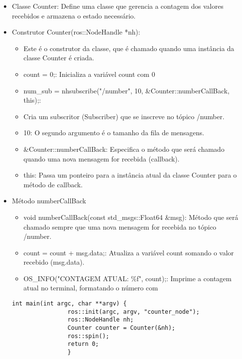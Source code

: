 \documentclass[letterpaper]{article}
\begin{document}
\begin{itemize}
\begin{lstlisting}[style=cppStyle, title= declaração da classe counter ]
            \end{lstlisting}
            \item Classe Counter: Define uma classe que gerencia a contagem dos valores recebidos e armazena o estado necessário.
            \item Construtor Counter(ros::NodeHandle *nh):
            \begin{itemize}
                \item Este é o construtor da classe, que é chamado quando uma instância da classe Counter é criada.
                \item count = 0;: Inicializa a variável count com 0
                \item num\_sub = nh\-\>subscribe("/number", 10, \&Counter::numberCallBack, this);:
                \item Cria um subscritor (Subscriber) que se inscreve no tópico /number.
                \item 10: O segundo argumento é o tamanho da fila de mensagens.
                \item \&Counter::numberCallBack: Especifica o método que será chamado quando uma nova mensagem for recebida (callback).
                \item  this: Passa um ponteiro para a instância atual da classe Counter para o método de callback.
            \end{itemize}
            \item Método numberCallBack
            \begin{itemize}
                \item void numberCallBack(const std\_msgs::Float64 \&msg): Método que será chamado sempre que uma nova mensagem for recebida no tópico /number.
                \item count = count + msg.data;: Atualiza a variável count somando o valor recebido (msg.data).
                \item OS\_INFO("CONTAGEM ATUAL: \%f", count);: Imprime a contagem atual no terminal, formatando o número com %
            \end{itemize}  
            \begin{lstlisting}[style=cppStyle, title= Função main ]
                 int main(int argc, char **argv) {
                ros::init(argc, argv, "counter_node");
                ros::NodeHandle nh;
                Counter counter = Counter(&nh);
                ros::spin();
                return 0;
                }
            \end{lstlisting}

\end{itemize}
\end{document}
